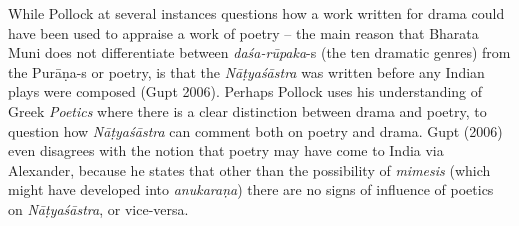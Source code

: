 While Pollock at several instances questions how a work written for drama could have been used to appraise a work of poetry -- the main reason that Bharata Muni does not differentiate between \hbox{\textsl{daśa-rūpaka}-s} (the ten dramatic genres) from the Purāṇa-s or poetry, is that the \textsl{Nāṭyaśāstra} was written before any Indian plays were composed (Gupt 2006). Perhaps Pollock uses his understanding of Greek \textsl{Poetics} where there is a clear distinction between drama and poetry, to question how \textsl{Nāṭyaśāstra} can comment both on poetry and drama. Gupt (2006) even disagrees with the notion that poetry may have come to India via Alexander, because he states that other than the possibility of \textsl{mimesis} (which might have developed into \textsl{anukaraṇa}) there are no signs of influence of poetics on \textsl{Nāṭyaśāstra}, or vice-versa. 

